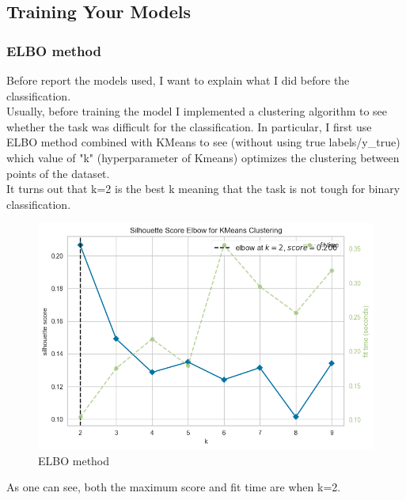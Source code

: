 \documentclass[unicode,11pt,a4paper,oneside,numbers=endperiod,openany]{scrartcl}
\begin{document}
\subsection{Training Your Models}
\subsubsection*{ELBO method}
Before report the models used, I want to explain what I did before the classification. \\
Usually, before training the model I implemented a clustering algorithm to see whether the task was difficult for the classification. In particular, I first use ELBO method combined with KMeans to see (without using true labels/y\_true) which value of "k" (hyperparameter of Kmeans) optimizes the clustering between points of the dataset. \\
It turns out that k=2 is the best k meaning that the task is not tough for binary classification. 
\begin{figure}[H]
  \includegraphics[scale=0.6]{images/ELBO.png}
  \centering
  \caption{ELBO method}
  \label{fig:ELBO}
\end{figure}
As one can see, both the maximum score and fit time are when k=2. 
\end{document}
